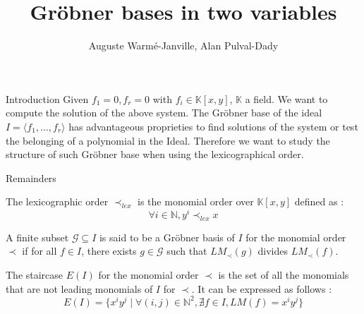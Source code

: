 \documentclass{beamer}
\title{Gröbner bases in two variables}
\author{Auguste Warmé-Janville, Alan Pulval-Dady}
\institute{Sorbonne Université}
\begin{document}
\frame{\titlepage}



\begin{frame}{Introduction}
    Given $f_1 = 0, f_r = 0$ with $f_i \in \mathbb{K}[x,y]$, $\mathbb{K}$ a field.
    We want to compute the solution of the above system.
    The Gröbner base of the ideal $I = \langle f_1,\dots,f_r \rangle$ has advantageous proprieties to find solutions of the system or test the belonging of a polynomial in the Ideal.
    Therefore we want to study the structure of such Gröbner base when using the lexicographical order.
\end{frame}

\begin{frame}{Remainders}
    \begin{definition}\label{def:lexicographic-order}
        The lexicographic order $\prec_{lex}$ is the monomial order over $\mathbb{K}[x, y]$ defined as : 
        \begin{displaymath}
            \forall i \in \mathbb{N}, y^{i} \prec_{lex} x
        \end{displaymath}
    \end{definition}
    \begin{definition}
        A finite subset $\mathscr{G} \subseteq I$ is said to be a Gröbner basis of $I$ for the monomial order $\prec$ if for all $f \in I$, there exists $g \in \mathscr{G}$ such that $LM_{\prec}(g)$ divides $LM_{\prec}(f)$. 
    \end{definition}
    \begin{definition}[Staircase]
        The staircase $E(I)$ for the monomial order $\prec$ is the set of all the monomials that are not leading monomials of $I$ for $\prec$. It can be expressed as follows : 
        \begin{displaymath}
            E(I) = \{ x^{i}y^{j} \mid \forall (i, j) \in \mathbb{N}^{2}, \nexists f \in I, LM(f) = x^{i}y^{j}\}
        \end{displaymath}
    \end{definition}
\end{frame}
\end{document}
